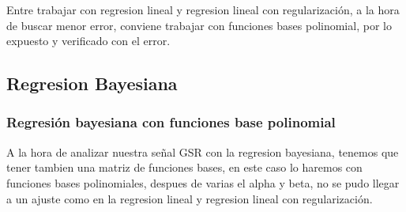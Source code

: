 \documentclass[11pt]{article}
\begin{document}
    Entre trabajar con regresion lineal y regresion lineal con
regularización, a la hora de buscar menor error, conviene trabajar con
funciones bases polinomial, por lo expuesto y verificado con el error.

    \subsection{Regresion Bayesiana}\label{regresion-bayesiana}

    \subsubsection{Regresión bayesiana con funciones base
polinomial}\label{regresiuxf3n-bayesiana-con-funciones-base-polinomial}

    A la hora de analizar nuestra señal GSR con la regresion bayesiana,
tenemos que tener tambien una matriz de funciones bases, en este caso lo
haremos con funciones bases polinomiales, despues de varias el alpha y
beta, no se pudo llegar a un ajuste como en la regresion lineal y
regresion lineal con regularización.
\end{document}
